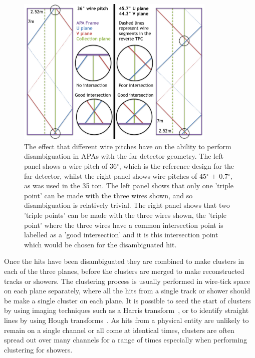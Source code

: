 \begin{figure}[h!]
  \centering
  \includegraphics[width=0.85\textwidth]{WireAngleCondition}
  \caption[Performing disambiguation with different wire pitches.]
          {The effect that different wire pitches have on the ability to perform disambiguation in APAs with the far detector geometry. The left panel shows a wire pitch of 36$^{\circ}$, which is the reference design for the far detector, whilst the right panel shows wire pitches of 45$^{\circ}$ $\pm$ 0.7$^{\circ}$, as was used in the 35 ton. The left panel shows that only one 'triple point' can be made with the three wires shown, and so disambiguation is relatively trivial. The right panel shows that two 'triple points' can be made with the three wires shown, the 'triple point' where the three wires have a common intersection point is labelled as a 'good intersection' and it is this intersection point which would be chosen for the disambiguated hit.}
  \label{fig:WirePitches}
\end{figure}

Once the hits have been disambiguated they are combined to make clusters in each of the three planes, before the clusters are merged to make reconstructed tracks or showers. The clustering process is usually performed in wire-tick space on each plane separately, where all the hits from a single track or shower should be make a single cluster on each plane. It is possible to seed the start of clusters by using imaging techniques such as a Harris transform~\citep{HarrisTrans}, or to identify straight lines by using Hough transforms~\citep{HoughTrans}. As hits from a physical entity are unlikely to remain on a single channel or all come at identical times, clusters are often spread out over many channels for a range of times especially when performing clustering for showers. \\

